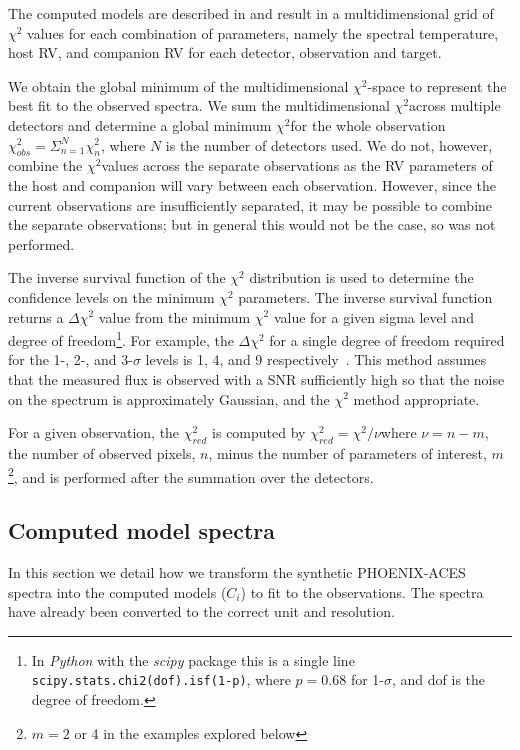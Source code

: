 The computed models are described in  and result in a multidimensional grid of \(\chi^2\) values for each combination of parameters, namely the spectral temperature, host {RV}, and companion {RV} for each detector, observation and target.

We obtain the global minimum of the multidimensional \(\chi^{2}\)-space to represent the best fit to the observed spectra. We sum the multidimensional \(\chi^{2}\)across multiple detectors and determine a global minimum \(\chi^{2}\)for the whole observation \(\chi^{2}_{obs} = \Sigma^{N}_{n=1} \chi^{2}_n\), where \(N\) is the number of detectors used. We do not, however, combine the \(\chi^{2}\)values across the separate observations as the {RV} parameters of the host and companion will vary between each observation. However, since the current observations are insufficiently separated, it may be possible to combine the separate observations; but in general this would not be the case, so was not performed.

The inverse survival function of the \(\chi^2\) distribution is used to determine the confidence levels on the minimum \(\chi^2\) parameters. The inverse survival function returns a \(\Delta\chi^2\) value from the minimum \(\chi^2\) value for a given sigma level and degree of freedom\footnote{In \emph{Python} with the \emph{scipy} package this is a single line \texttt{scipy.stats.chi2{(dof)}.isf{(1-p)}}, where \(p = 0.68\) for 1-\(\sigma\), and dof is the degree of freedom.}.
For example, the \(\Delta \chi^2\) for a single degree of freedom required for the 1-, 2-, and 3-\(\sigma\) levels is 1, 4, and 9 respectively~\citep{bevington_data_2003}. This method assumes that the measured flux is observed with a {SNR} sufficiently high so that the noise on the spectrum is approximately Gaussian, and the \(\chi^2\) method appropriate.

For a given observation, the \(\chi^{2}_{red}\) is computed by \(\chi^2_{red} = \chi^2 / \nu\)where \(\nu = n - m\), the number of observed pixels, \(n\), minus the number of parameters of interest, \(m\)\footnote{\(m=2\) or 4 in the examples explored below}, and is performed after the summation over the detectors.




\subsection{Computed model spectra}
\label{models}
In this section we detail how we transform the synthetic {PHOENIX-ACES} spectra into the computed models (\(C_i\)) to fit to the observations. The spectra have already been converted to the correct unit and resolution.

